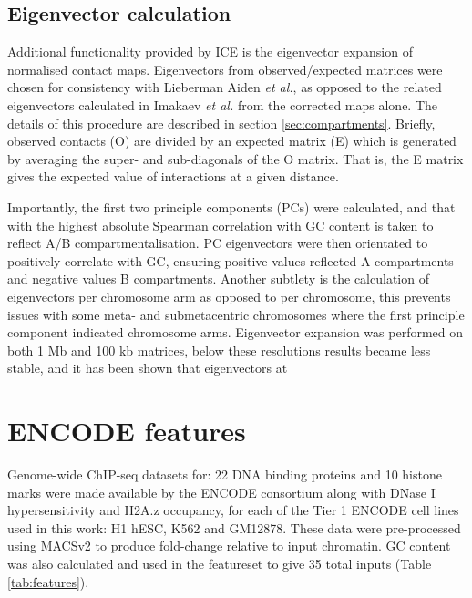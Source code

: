\documentclass[a4paper,10pt,oneside]{book}
\begin{document}
\subsection{Eigenvector calculation}
Additional functionality provided by ICE is the eigenvector expansion of normalised contact maps. Eigenvectors from observed/expected matrices were chosen for consistency with Lieberman Aiden \emph{et al.},\cite{Lieberman2009} as opposed to the related eigenvectors calculated in Imakaev \emph{et al.}\cite{Imakaev2012} from the corrected maps alone. The details of this procedure are described in section \ref{sec:compartments}. Briefly, observed contacts (O) are divided by an expected matrix (E) which is generated by averaging the super- and sub-diagonals of the O matrix. That is, the E matrix gives the expected value of interactions at a given distance.

Importantly, the first two principle components (PCs) were calculated, and that with the highest absolute Spearman correlation with GC content is taken to reflect A/B compartmentalisation. PC eigenvectors were then orientated to positively correlate with GC, ensuring positive values reflected A compartments and negative values B compartments. Another subtlety is the calculation of eigenvectors per chromosome arm as opposed to per chromosome, this prevents issues with some meta- and submetacentric chromosomes where the first principle component indicated chromosome arms.\cite{Lieberman2009, Imakaev2012} Eigenvector expansion was performed on both 1 Mb and 100 kb matrices, below these resolutions results became less stable, and it has been shown that eigenvectors at

\section{ENCODE features}\label{locus-level-features}

Genome-wide ChIP-seq datasets for: 22 DNA binding proteins and 10
histone marks were made available by the ENCODE
consortium\citep{Dunham2012, Boyle2014} along with DNase I
hypersensitivity and H2A.z occupancy, for each of the Tier 1 ENCODE cell
lines used in this work: H1 hESC, K562 and GM12878. These data were
pre-processed using MACSv2\citep{Zhang2008} to produce fold-change
relative to input chromatin. GC content was also calculated and used in
the featureset to give 35 total inputs (Table \ref{tab:features}).
\end{document}
